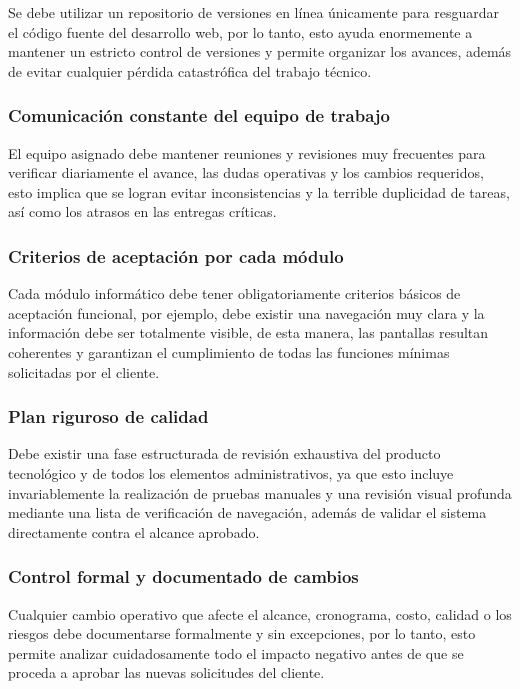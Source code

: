 \documentclass[11pt,spanish]{article}
\begin{document}
Se debe utilizar un repositorio de versiones en línea únicamente para resguardar el código fuente del desarrollo web, por lo tanto, esto ayuda enormemente a mantener un estricto control de versiones y permite organizar los avances, además de evitar cualquier pérdida catastrófica del trabajo técnico.

\subsubsection{Comunicación constante del equipo de trabajo}

El equipo asignado debe mantener reuniones y revisiones muy frecuentes para verificar diariamente el avance, las dudas operativas y los cambios requeridos, esto implica que se logran evitar inconsistencias y la terrible duplicidad de tareas, así como los atrasos en las entregas críticas.

\subsubsection{Criterios de aceptación por cada módulo}

Cada módulo informático debe tener obligatoriamente criterios básicos de aceptación funcional, por ejemplo, debe existir una navegación muy clara y la información debe ser totalmente visible, de esta manera, las pantallas resultan coherentes y garantizan el cumplimiento de todas las funciones mínimas solicitadas por el cliente.

\subsubsection{Plan riguroso de calidad}

Debe existir una fase estructurada de revisión exhaustiva del producto tecnológico y de todos los elementos administrativos, ya que esto incluye invariablemente la realización de pruebas manuales y una revisión visual profunda mediante una lista de verificación de navegación, además de validar el sistema directamente contra el alcance aprobado.

\subsubsection{Control formal y documentado de cambios}

Cualquier cambio operativo que afecte el alcance, cronograma, costo, calidad o los riesgos debe documentarse formalmente y sin excepciones, por lo tanto, esto permite analizar cuidadosamente todo el impacto negativo antes de que se proceda a aprobar las nuevas solicitudes del cliente.
\end{document}
